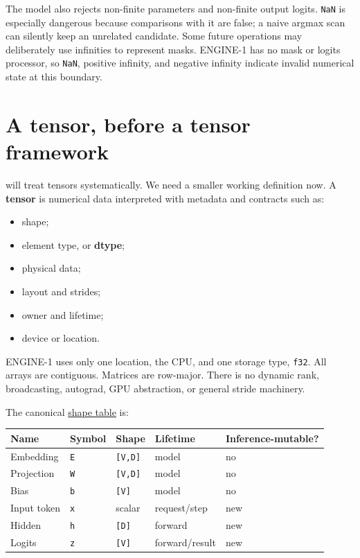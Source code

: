 The model also rejects non-finite parameters and non-finite output
logits. \texttt{NaN} is especially dangerous because comparisons with it
are false; a naive argmax scan can silently keep an unrelated candidate.
Some future operations may deliberately use infinities to represent
masks. ENGINE-1 has no mask or logits processor, so \texttt{NaN},
positive infinity, and negative infinity indicate invalid numerical
state at this boundary.

\section{A tensor, before a tensor
framework}\label{a-tensor-before-a-tensor-framework}

 will treat tensors systematically. We need a smaller working
definition now. A \textbf{tensor} is numerical data interpreted with
metadata and contracts such as:

\begin{itemize}
\tightlist
\item
  shape;
\item
  element type, or \textbf{dtype};
\item
  physical data;
\item
  layout and strides;
\item
  owner and lifetime;
\item
  device or location.
\end{itemize}

ENGINE-1 uses only one location, the CPU, and one storage type,
\texttt{f32}. All arrays are contiguous. Matrices are row-major. There
is no dynamic rank, broadcasting, autograd, GPU abstraction, or general
stride machinery.

The canonical
\href{https://github.com/hermonai/inside-the-llm-engine/blob/astra-visual-rewrite/diagrams/model/tiny-model-tensor-shapes.txt}{shape
table} is:

{\def\LTcaptype{none} %
\begin{longtable}[]{@{}lllll@{}}
\toprule\noalign{}
Name & Symbol & Shape & Lifetime & Inference-mutable? \\
\midrule\noalign{}
\endhead
\bottomrule\noalign{}
\endlastfoot
Embedding & \texttt{E} & \texttt{{[}V,D{]}} & model & no \\
Projection & \texttt{W} & \texttt{{[}V,D{]}} & model & no \\
Bias & \texttt{b} & \texttt{{[}V{]}} & model & no \\
Input token & \texttt{x} & scalar & request/step & new \\
Hidden & \texttt{h} & \texttt{{[}D{]}} & forward & new \\
Logits & \texttt{z} & \texttt{{[}V{]}} & forward/result & new \\
\end{longtable}
}

